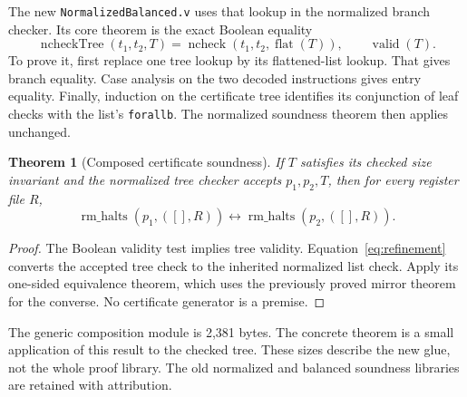 \documentclass[11pt,letterpaper]{article}
\newtheorem{theorem}{Theorem}[section]
\newcommand{\code}[1]{\texttt{#1}}
\begin{document}
The new \code{NormalizedBalanced.v} uses that lookup in the normalized branch checker. Its core theorem is the exact Boolean equality
\begin{equation}
 \operatorname{ncheckTree}(t_1,t_2,T)
 =\operatorname{ncheck}(t_1,t_2,\operatorname{flat}(T)),
 \qquad\operatorname{valid}(T).
 \label{eq:refinement}
\end{equation}
To prove it, first replace one tree lookup by its flattened-list lookup. That gives branch equality. Case analysis on the two decoded instructions gives entry equality. Finally, induction on the certificate tree identifies its conjunction of leaf checks with the list's \code{forallb}. The normalized soundness theorem then applies unchanged.

\begin{theorem}[Composed certificate soundness]
If $T$ satisfies its checked size invariant and the normalized tree checker accepts $p_1,p_2,T$, then for every register file $R$,
\[
 \operatorname{rm\_halts}(p_1,([],R))\leftrightarrow
 \operatorname{rm\_halts}(p_2,([],R)).
\]
\end{theorem}
\begin{proof}
The Boolean validity test implies tree validity. Equation~\eqref{eq:refinement} converts the accepted tree check to the inherited normalized list check. Apply its one-sided equivalence theorem, which uses the previously proved mirror theorem for the converse. No certificate generator is a premise.
\end{proof}
The generic composition module is 2,381 bytes. The concrete theorem is a small application of this result to the checked tree. These sizes describe the new glue, not the whole proof library. The old normalized and balanced soundness libraries are retained with attribution.
\end{document}
